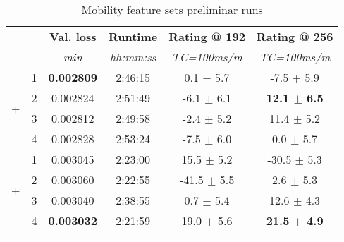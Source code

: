 
    \begin{table}[H]
\caption{Mobility feature sets preliminar runs}
\centering
\begin{adjustbox}{center}
\begin{tabular}{@{} cccc|cc @{}}
\toprule
\bf {} & \bf {} & \bf Val. loss & \bf Runtime & \bf Rating @ 192 & \bf Rating @ 256 \\
 &  & \textit{min} & \textit{hh:mm:ss} & \textit{TC=100ms/m} & \textit{TC=100ms/m} \\
\midrule
     & 1 & \bf0.002809 & 2:46:15 & 0.1 $\pm$ 5.7 & -7.5 $\pm$ 5.9\\
 & 2 & 0.002824 & 2:51:49 & -6.1 $\pm$ 6.1 & \bf12.1 $\pm$ 6.5\\
 & 3 & 0.002812 & 2:49:58 & -2.4 $\pm$ 5.2 & 11.4 $\pm$ 5.2\\
 & 4 & 0.002828 & 2:53:24 & -7.5 $\pm$ 6.0 & 0.0 $\pm$ 5.7\\
\midrule
{} & 1 & 0.003045 & 2:23:00 & 15.5 $\pm$ 5.2 & -30.5 $\pm$ 5.3\\
 & 2 & 0.003060 & 2:22:55 & -41.5 $\pm$ 5.5 & 2.6 $\pm$ 5.3\\
 & 3 & 0.003040 & 2:38:55 & 0.7 $\pm$ 5.4 & 12.6 $\pm$ 4.3\\
 & 4 & \bf0.003032 & 2:21:59 & 19.0 $\pm$ 5.6 & \bf21.5 $\pm$ 4.9\\
\toprule
{} \\
\end{tabular}
\end{adjustbox}
\end{table}
